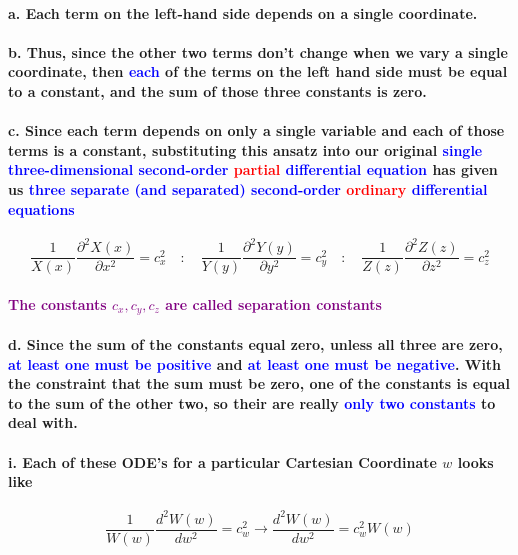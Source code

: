 \documentclass{article}
\begin{document}
\paragraph{\indent a. Each term on the left-hand side depends on a single coordinate.}
\paragraph{\indent b. Thus, since the other two terms don't change when we vary a single coordinate, then \textcolor{blue}{each} of the terms on the left hand side must be equal to a constant, and the sum of those three constants is zero.} 
\paragraph{\indent c. Since each term depends on only a single variable and each of those terms is a constant, substituting this ansatz into our original \textcolor{blue}{single three-dimensional second-order} \textcolor{red}{partial} \textcolor{blue}{differential equation} has given us \textcolor{blue}{three separate (and separated) second-order} \textcolor{red}{ordinary} \textcolor{blue}{differential equations}}
\begin{equation*}
    \frac{1}{X(x)}\frac{\partial^2X(x)}{\partial x^2}=c_x^2 \quad:\quad \frac{1}{Y(y)}\frac{\partial^2Y(y)}{\partial y^2}=c_y^2\quad:\quad \frac{1}{Z(z)}\frac{\partial^2Z(z)}{\partial z^2}=c_z^2
\end{equation*}
\paragraph{\textcolor{purple}{The constants $c_x,c_y,c_z$ are called separation constants}}
\paragraph{\indent d. Since the sum of the constants equal zero, unless all three are zero, \textcolor{blue}{at least one must be positive} and \textcolor{blue}{at least one must be negative}. With the constraint that the sum must be zero, one of the constants is equal to the sum of the other two, so their are really \textcolor{blue}{only two constants} to deal with.}
\paragraph{\indent i. Each of these ODE's for a particular Cartesian Coordinate $w$ looks like}
\begin{equation*}
    \frac{1}{W(w)}\frac{d^2W(w)}{dw^2}=c_w^2\longrightarrow \frac{d^2W(w)}{dw^2}=c_w^2W(w)
\end{equation*}
\end{document}
